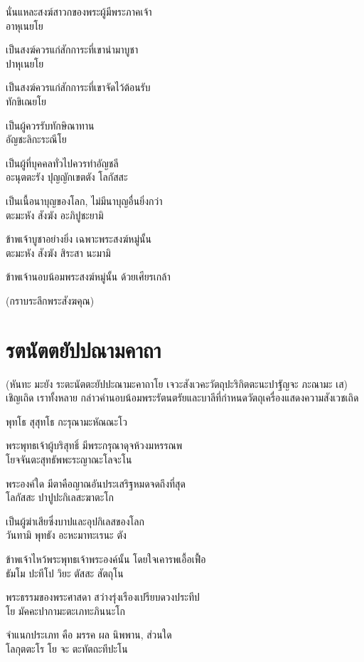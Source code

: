 \documentclass{article}
\begin{document}
นั่นแหละสงฆ์สาวกของพระผู้มีพระภาคเจ้า\\
อาหุเนยโย

เป็นสงฆ์ควรแก่สักการะที่เขานำมาบูชา\\
ปาหุเนยโย

เป็นสงฆ์ควรแก่สักการะที่เขาจัดไว้ต้อนรับ\\
ทักขิเณยโย

เป็นผู้ควรรับทักษิณาทาน\\
อัญชะลิกะระณีโย

เป็นผู้ที่บุคคลทั่วไปควรทำอัญชลี\\
อะนุตตะรัง ปุญญักเขตตัง โลกัสสะ

เป็นเนื้อนาบุญของโลก, ไม่มีนาบุญอื่นยิ่งกว่า\\
ตะมะหัง สังฆัง อะภิปูชะยามิ

ข้าพเจ้าบูชาอย่างยิ่ง เฉพาะพระสงฆ์หมู่นั้น\\
ตะมะหัง สังฆัง สิระสา นะมามิ

ข้าพเจ้านอบน้อมพระสงฆ์หมู่นั้น ด้วยเศียรเกล้า
\begin{center}
(กราบระลึกพระสังฆคุณ)
\end{center}
\pagebreak

\section{รตนัตตยัปปณามคาถา}
\begin{center}
(หันทะ มะยัง ระตะนัตตะยัปปะณามะคาถาโย เจวะสังเวคะวัตถุปะริกิตตะนะปาฐัญจะ ภะณามะ เส)\\เชิญเถิด เราทั้งหลาย กล่าวคำนอบน้อมพระรัตนตรัยและบาลีที่กำหนดวัตถุเครื่องแสดงความสังเวชเถิด
\end{center}
พุทโธ สุสุทโธ กะรุณามะหัณณะโว

พระพุทธเจ้าผู้บริสุทธิ์ มีพระกรุณาดุจห้วงมหรรณพ\\
โยจจันตะสุทธัพพะระญาณะโลจะโน

พระองค์ใด มีตาคือญาณอันประเสริฐหมดจดถึงที่สุด\\
โลกัสสะ ปาปูปะกิเลสะฆาตะโก

เป็นผู้ฆ่าเสียซึ่งบาปและอุปกิเลสของโลก\\
วันทามิ พุทธัง อะหะมาทะเรนะ ตัง

ข้าพเจ้าไหว้พระพุทธเจ้าพระองค์นั้น โดยใจเคารพเอื้อเฟื้อ\\
ธัมโม ปะทีโป วิยะ ตัสสะ สัตถุโน

พระธรรมของพระศาสดา สว่างรุ่งเรืองเปรียบดวงประทีป\\
โย มัคคะปากามะตะเภทะภินนะโก

จำแนกประเภท คือ มรรค ผล นิพพาน, ส่วนใด\\
โลกุตตะโร โย จะ ตะทัตถะทีปะโน
\end{document}
